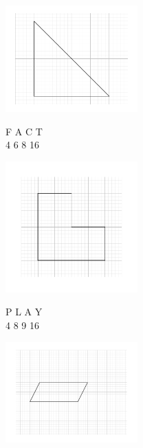 \documentclass{article}
\begin{document}
\begin{flushleft}
\begin{center}
\end{center}

\newpage

\begin{center}
\includegraphics[width=2in]{IsoRightTriangle.pdf}

F \hspace{0.5in} A \hspace{0.5in} C  \hspace{0.5in} T\\
4 \hspace{0.54in} 6 \hspace{0.54in} 8 \hspace{0.54in} 16 

\end{center}

\begin{center}
\includegraphics[width=2in]{L-Shape.pdf}

P \hspace{0.5in} L \hspace{0.5in}  A \hspace{0.5in} Y\\
4 \hspace{0.54in} 8 \hspace{0.54in} 9 \hspace{0.54in} 16

\end{center}

\begin{center}
\includegraphics[width=2in]{Parallelogram.pdf}


\end{center}
\end{flushleft}
\end{document}
